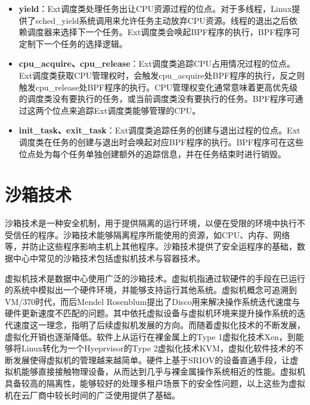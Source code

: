 \begin{itemize}
    \item \textbf{yield}：Ext调度类处理任务出让CPU资源过程的位点。对于多线程，Linux提供了sched\_yield系统调用来允许任务主动放弃CPU资源。线程的退出之后依赖调度器来选择下一个任务。Ext调度类会唤起BPF程序的执行，BPF程序可定制下一个任务的选择逻辑。

    \item \textbf{cpu\_acquire、cpu\_release}：Ext调度类追踪CPU占用情况过程的位点。Ext调度类获取CPU管理权时，会触发cpu\_acquire处BPF程序的执行，反之则触发cpu\_release处BPF程序的执行。CPU管理权变化通常意味着更高优先级的调度类没有要执行的任务，或当前调度类没有要执行的任务。BPF程序可通过这两个位点来追踪Ext调度类能够管理的CPU。

    \item \textbf{init\_task、exit\_task}：Ext调度类追踪任务的创建与退出过程的位点。Ext调度类在任务的创建与退出时会唤起对应BPF程序的执行。BPF程序可在这些位点处为每个任务单独创建额外的追踪信息，并在任务结束时进行销毁。

\end{itemize}

\section{沙箱技术}


沙箱技术是一种安全机制，用于提供隔离的运行环境，以便在受限的环境中执行不受信任的程序。沙箱技术能够隔离程序所能使用的资源，如CPU、内存、网络等，并防止这些程序影响主机上其他程序。沙箱技术提供了安全运程序的基础，数据中心中常见的沙箱技术包括虚拟机技术与容器技术。

虚拟机技术是数据中心使用广泛的沙箱技术。虚拟机指通过软硬件的手段在已运行的系统中模拟出一个硬件环境，并能够支持运行其他系统。虚拟机概念可追溯到VM/370\citep{creasy1981origin}时代，而后Mendel Rosenblum提出了Disco\citep{bugnion1997disco}用来解决操作系统迭代速度与硬件更新速度不匹配的问题。其中依托虚拟设备与虚拟机环境来提升操作系统的迭代速度这一理念，指明了后续虚拟机发展的方向。而随着虚拟化技术的不断发展，虚拟化开销也逐渐降低。软件上从运行在裸金属上的Type 1虚拟化技术Xen\citep{barham2003xen}，到能够将Linux转化为一个Hyeprvisor的Type 2虚拟化技术KVM\citep{kivity2007kvm}，虚拟化软件技术的不断发展使得虚拟机的管理越来越简单。硬件上基于SRIOV的设备直通手段\citep{dong2012high}，让虚拟机能够直接接触物理设备，从而达到几乎与裸金属操作系统相近的性能。虚拟机具备较高的隔离性，能够较好的处理多租户场景下的安全性问题，以上这些为虚拟机在云厂商中较长时间的广泛使用提供了基础。

